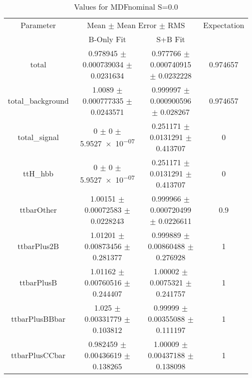 \begin{table}
\centering
\caption{Values for MDFnominal S=0.0}
\begin{tabular}{cccc}
\toprule
Parameter & \multicolumn{2}{c}{Mean $\pm$ Mean Error $\pm$ RMS} & Expectation\\
 & B-Only Fit & S+B Fit & \\
\midrule
total & \num{0.978945} $\pm$ \num{0.000739034} $\pm$ \num{0.0231634} & \num{0.977766} $\pm$ \num{0.000740915} $\pm$ \num{0.0232228} & \num{0.974657}\\
total\_background & \num{1.0089} $\pm$ \num{0.000777335} $\pm$ \num{0.0243571} & \num{0.999997} $\pm$ \num{0.000900596} $\pm$ \num{0.028267} & \num{0.974657}\\
total\_signal & \num{0} $\pm$ \num{0} $\pm$ \num{5.9527e-07} & \num{0.251171} $\pm$ \num{0.0131291} $\pm$ \num{0.413707} & \num{0}\\
ttH\_hbb & \num{0} $\pm$ \num{0} $\pm$ \num{5.9527e-07} & \num{0.251171} $\pm$ \num{0.0131291} $\pm$ \num{0.413707} & \num{0}\\
ttbarOther & \num{1.00151} $\pm$ \num{0.00072583} $\pm$ \num{0.0228243} & \num{0.999966} $\pm$ \num{0.000720499} $\pm$ \num{0.0226611} & \num{0.9}\\
ttbarPlus2B & \num{1.01201} $\pm$ \num{0.00873456} $\pm$ \num{0.281377} & \num{0.999889} $\pm$ \num{0.00860488} $\pm$ \num{0.276928} & \num{1}\\
ttbarPlusB & \num{1.01162} $\pm$ \num{0.00760516} $\pm$ \num{0.244407} & \num{1.00002} $\pm$ \num{0.0075321} $\pm$ \num{0.241757} & \num{1}\\
ttbarPlusBBbar & \num{1.025} $\pm$ \num{0.00331779} $\pm$ \num{0.103812} & \num{0.99999} $\pm$ \num{0.00355088} $\pm$ \num{0.111197} & \num{1}\\
ttbarPlusCCbar & \num{0.982459} $\pm$ \num{0.00436619} $\pm$ \num{0.138265} & \num{1.00009} $\pm$ \num{0.00437188} $\pm$ \num{0.138098} & \num{1}\\
\bottomrule
\end{tabular}
\end{table}